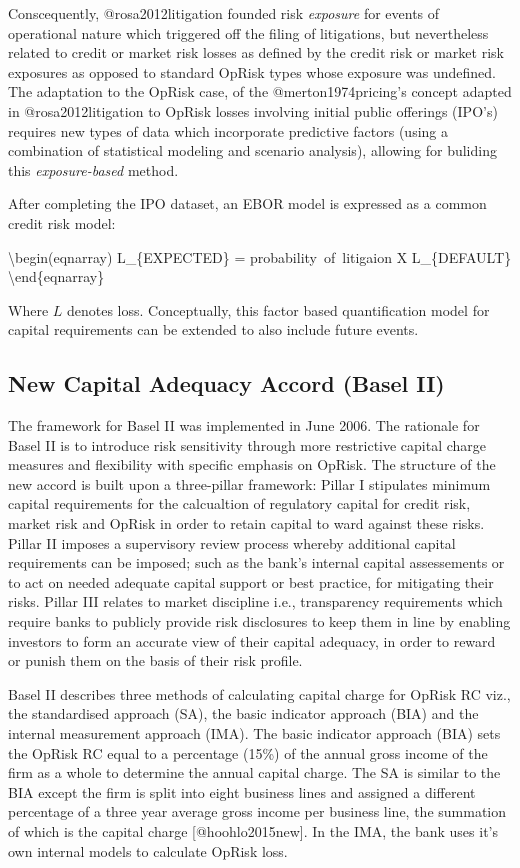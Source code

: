 \documentclass[]{article}
\begin{document}
Conscequently, @rosa2012litigation founded risk \emph{exposure} for
events of operational nature which triggered off the filing of
litigations, but nevertheless related to credit or market risk losses as
defined by the credit risk or market risk exposures as opposed to
standard OpRisk types whose exposure was undefined. The adaptation to
the OpRisk case, of the @merton1974pricing's concept adapted in
@rosa2012litigation to OpRisk losses involving initial public offerings
(IPO's) requires new types of data which incorporate predictive factors
(using a combination of statistical modeling and scenario analysis),
allowing for buliding this \emph{exposure-based} method.\medskip

After completing the IPO dataset, an EBOR model is expressed as a common
credit risk model:

\textbackslash{}begin(eqnarray) L\_\{EXPECTED\} =
\mbox{probability of litigaion} X L\_\{DEFAULT\}
\textbackslash{}end\{eqnarray\}

Where \(L\) denotes loss. Conceptually, this factor based quantification
model for capital requirements can be extended to also include future
events.

\subsection{New Capital Adequacy Accord (Basel II)}

The framework for Basel II was implemented in June 2006. The rationale
for Basel II is to introduce risk sensitivity through more restrictive
capital charge measures and flexibility with specific emphasis on
OpRisk. The structure of the new accord is built upon a three-pillar
framework: Pillar I stipulates minimum capital requirements for the
calcualtion of regulatory capital for credit risk, market risk and
OpRisk in order to retain capital to ward against these risks. Pillar II
imposes a supervisory review process whereby additional capital
requirements can be imposed; such as the bank's internal capital
assessements or to act on needed adequate capital support or best
practice, for mitigating their risks. Pillar III relates to market
discipline i.e., transparency requirements which require banks to
publicly provide risk disclosures to keep them in line by enabling
investors to form an accurate view of their capital adequacy, in order
to reward or punish them on the basis of their risk profile.\medskip

Basel II describes three methods of calculating capital charge for
OpRisk RC viz., the standardised approach (SA), the basic indicator
approach (BIA) and the internal measurement approach (IMA). The basic
indicator approach (BIA) sets the OpRisk RC equal to a percentage (15\%)
of the annual gross income of the firm as a whole to determine the
annual capital charge. The SA is similar to the BIA except the firm is
split into eight business lines and assigned a different percentage of a
three year average gross income per business line, the summation of
which is the capital charge {[}@hoohlo2015new{]}. In the IMA, the bank
uses it's own internal models to calculate OpRisk loss.
\end{document}
